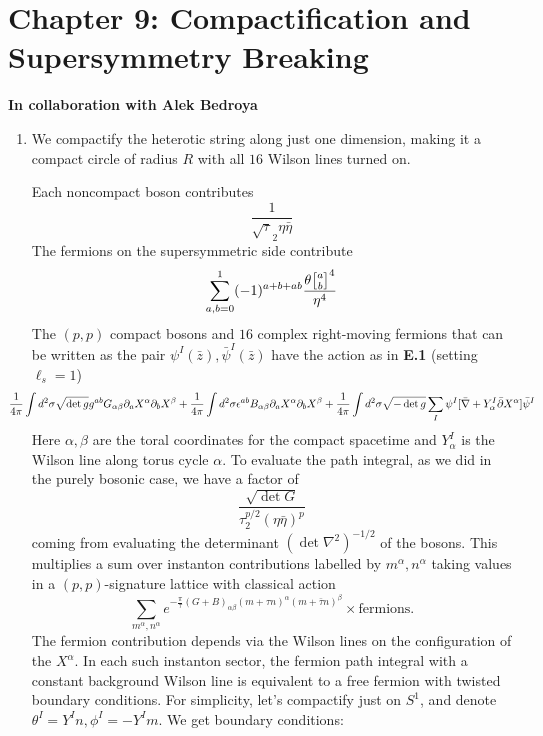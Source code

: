 \documentclass[11pt, class=article, crop=false]{standalone}
\begin{document}
\section*{Chapter 9: Compactification and Supersymmetry Breaking} %
\label{sec:chapter_9_compactification_and_supersymmetry_breaking}
\begin{center}
	\vspace{-.05in}
	\textbf{In collaboration with Alek Bedroya}
	\vspace{-.05in}
\end{center}
\begin{enumerate}
	\item We compactify the heterotic string along just one dimension, making it a compact circle of radius $R$ with all $16$ Wilson lines turned on. 
	
	Each noncompact boson contributes
		\[
			\frac{1}{\sqrt \tau_2 \eta \bar \eta }
		\]
	The fermions on the supersymmetric side contribute
		\[
			\sum_{a,b=0}^1 (-1)^{a+b+ab} \frac{\theta\twist{a}{b}^4}{\eta^4}
		\]
	The $(p,p)$ compact bosons and $16$ complex right-moving fermions that can be written as the pair $\psi^I(\bar z), \bar \psi^I(\bar z)$ have the action as in \textbf{E.1} (setting $\ell_s = 1$)
		\[		\hspace{-.3in}
			\frac{1}{4\pi} \int d^2 \sigma \sqrt{\det g} g^{ab} G_{\alpha \beta} \d_a X^\alpha \d_b X^\beta + \frac{1}{4\pi} \int d^2 \sigma \epsilon^{ab} B_{\alpha \beta}\d_a X^\alpha \d_b X^\beta + \frac{1}{4\pi} \int d^2 \sigma \sqrt{- \det g} \sum_I \psi^I [\bar \nabla + Y_\alpha^I \bar \d X^\alpha] \bar \psi^I
		\]
		Here $\alpha, \beta$ are the toral coordinates for the compact spacetime and $Y^I_\alpha$ is the Wilson line along torus cycle $\alpha$. To evaluate the path integral, as we did in the purely bosonic case, we have a factor of
		\[
			\frac{\sqrt{\det G}}{\tau_2^{p/2} (\eta \bar \eta)^{p}}
		\] 
		coming from evaluating the determinant $(\det \nabla^{2})^{-1/2}$ of the bosons. This multiplies a sum over instanton contributions labelled by $m^\alpha, n^\alpha$ taking values in a $(p,p)$-signature lattice with classical action 
		\[
			\sum_{m^\alpha, n^\alpha} e^{-\frac{\pi}{\tau} (G+B)_{\alpha \beta} (m + \tau n)^\alpha (m + \bar \tau n)^\beta} \times \text{fermions}.
		\]
		The fermion contribution depends via the Wilson lines on the configuration of the $X^\alpha$. In each such instanton sector, the fermion path integral with a constant background Wilson line is equivalent to a free fermion with twisted boundary conditions. For simplicity, let's compactify just on $S^1$, and denote $\theta^I = Y^I n, \phi^I = -Y^I m$. We get boundary conditions: 

\end{enumerate}
\end{document}
